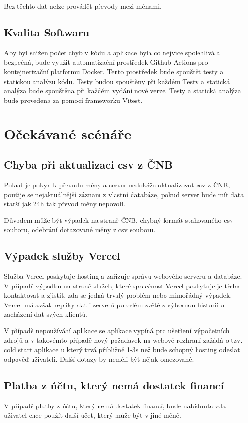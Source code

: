 \documentclass[FM,SP]{tulthesis}
\begin{document}
Bez těchto dat nelze provádět převody mezi měnami.

\subsection{Kvalita Softwaru}
Aby byl snížen počet chyb v kódu a aplikace byla co nejvíce spolehlivá a bezpečná, bude využit automatizační prostředek Github Actions pro kontejnerizační platformu Docker. Tento prostředek bude spouštět testy a statickou analýzu kódu. Testy budou spouštěny při každém Testy a statická analýza bude spouštěna při každém vydání nové verze. Testy a statická analýza bude provedena za pomocí frameworku Vitest.

\section{Očekávané scénáře}
\subsection{Chyba při aktualizaci csv z ČNB}
Pokud je pokyn k převodu měny a server nedokáže aktualizovat csv z ČNB, použije se nejaktuálnější záznam z vlastní databáze, pokud server bude mít data starší jak 24h tak převod měny nepovolí.

Důvodem může být výpadek na straně ČNB, chybný formát stahovaného csv souboru, odebrání dotazované měny z csv souboru.

\subsection{Výpadek služby Vercel}
Služba Vercel poskytuje hosting a zařizuje správu webového serveru a databáze. V případě výpadku na straně služeb, které společnost Vercel poskytuje je třeba kontaktovat a zjistit, zda se jedná trvalý problém nebo mimořádný výpadek. Vercel má avšak repliky dat i serverů po celém světě s výbornou historií o zacházení dat svých klientů.

V případě nepoužívání aplikace se aplikace vypíná pro ušetření výpočetních zdrojů a v takovémto případě nový požadavek na webové rozhraní zažádá o tzv. cold start aplikace u který trvá přibližně 1-3s než bude schopný hosting odeslat odpověď uživateli. Další dotazy by neměli být nějak omezované.

\subsection{Platba z účtu, který nemá dostatek financí}
V případě platby z účtu, který nemá dostatek financí, bude nabídnuto zda uživatel chce použít další účet, který může být v jiné měně.
\end{document}
